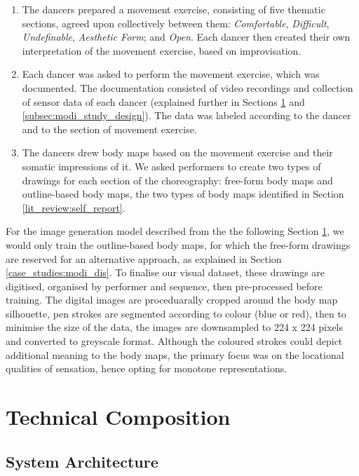 \begin{enumerate}
    \item  The dancers prepared a movement exercise, consisting of five thematic sections, agreed upon collectively between them: \textit{Comfortable}, \textit{Difficult}, \textit{Undefinable}, \textit{Aesthetic Form}; and \textit{Open}. Each dancer then created their own interpretation of the movement exercise, based on improvisation.
    \item Each dancer was asked to perform the movement exercise, which was documented. The documentation consisted of video recordings and collection of sensor data of each dancer (explained further in Sections \ref{sec:latent_technical_composition} and \ref{subsec:modi_study_design}). The data was labeled according to the dancer and to the section of movement exercise.
    \item The dancers drew body maps based on the movement exercise and their somatic impressions of it. We asked performers to create two types of drawings for each section of the choreography: free-form body maps and outline-based body maps, the two types of body maps identified in Section \ref{lit_review:self_report}.
\end{enumerate}

For the image generation model described from the the following Section \ref{sec:latent_technical_composition}, we would only train the outline-based body maps, for which the free-form drawings are reserved for an alternative approach, as explained in Section \ref{case_studies:modi_dis}. To finalise our visual dataset, these drawings are digitised, organised by performer and sequence, then pre-processed before training. The digital images are proceduarally cropped around the body map silhouette, pen strokes are segmented according to colour (blue or red), then to minimise the size of the data, the images are downsampled to 224 x 224 pixels and converted to greyscale format. Although the coloured strokes could depict additional meaning to the body maps, the primary focus was on the locational qualities of sensation, hence opting for monotone representations.

\section{Technical Composition}
\label{sec:latent_technical_composition}

\subsection*{System Architecture}

